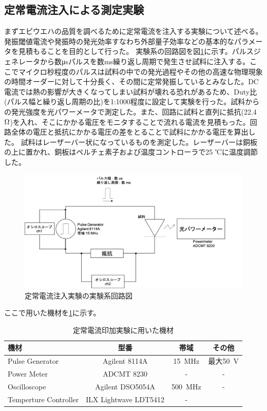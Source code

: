 \subsection{定常電流注入による測定実験}%
まずエピウエハの品質を調べるために定常電流を注入する実験について述べる。発振閾値電流や発振時の発光効率すなわち外部量子効率などの基本的なパラメータを見積もることを目的として行った。
実験系の回路図を図\ref{fig:fig_2_2_IL_setup}に示す。パルスジェネレータから数\si{\micro s}パルスを数ms繰り返し周期で発生させ試料に注入する。ここでマイクロ秒程度のパルスは試料の中での発光過程やその他の高速な物理現象の時間オーダーに対して十分長く、その間に定常発振しているとみなした。DC電流では熱の影響が大きくなってしまい試料が壊れる恐れがあるため、Duty比(パルス幅と繰り返し周期の比)を1:1000程度に設定して実験を行った。試料からの発光強度を光パワーメータで測定した。また、回路に試料と直列に抵抗(22.4 $\rm{\Omega}$)を入れ、そこにかかる電圧をモニタすることで流れる電流を見積もった。回路全体の電圧と抵抗にかかる電圧の差をとることで試料にかかる電圧を算出した。
試料はレーザーバー状になっているものを測定した。レーザーバーは銅板の上に置かれ、銅板はペルチェ素子および温度コントローラで25 ℃に温度調節した。

\begin{figure}[htbp]
	\includegraphics[width=15cm]{figure/fig_2_2_IL_setup.png}
	\caption{定常電流注入実験の実験系回路図}
	\label{fig:fig_2_2_IL_setup}
\end{figure}
\clearpage
ここで用いた機材を\ref{table:table_2_2_IL_setup}に示す。
\begin{table}[h]
  \caption{定常電流印加実験に用いた機材}
    \label{table:table_2_2_IL_setup}
  \centering
  \begin{tabular}{lccc}
    \hline
    機材  & 型番 &帯域  & その他  \\
    \hline \hline
    Pulse Generator  & Agilent 8114A & 15\ MHz &最大50\ V \\
    Power Meter  &  ADCMT 8230 & -&-  \\
    Oscilloscope  &  Agilent DSO5054A &500\ MHz&- \\
    Temperture Controller & ILX Lightwave  LDT5412&-\\
       \hline
  \end{tabular}
\end{table}
